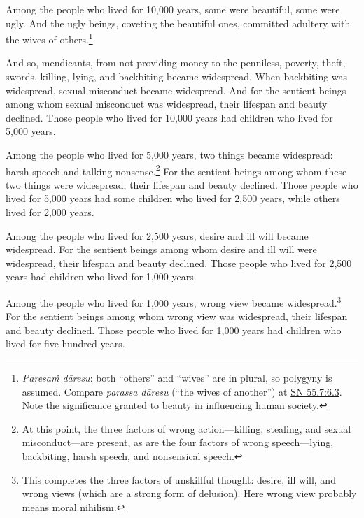 \documentclass[12pt,openany]{book}%
\begin{document}
Among the people who lived for 10,000 years, some were beautiful, some were ugly. And the ugly beings, coveting the beautiful ones, committed adultery with the wives of others.\footnote{\textit{\textsanskrit{Paresaṁ} \textsanskrit{dāresu}}: both “others” and “wives” are in plural, so polygyny is assumed. Compare \textit{parassa \textsanskrit{dāresu}} (“the wives of another”) at \href{https://suttacentral.net/sn55.7/en/sujato\#6.3}{SN 55.7:6.3}. Note the significance granted to beauty in influencing human society. } 

And so, mendicants, from not providing money to the penniless, poverty, theft, swords, killing, lying, and backbiting became widespread. When backbiting was widespread, sexual misconduct became widespread. And for the sentient beings among whom sexual misconduct was widespread, their lifespan and beauty declined. Those people who lived for 10,000 years had children who lived for 5,000 years. 

Among the people who lived for 5,000 years, two things became widespread: harsh speech and talking nonsense.\footnote{At this point, the three factors of wrong action—killing, stealing, and sexual misconduct—are present, as are the four factors of wrong speech—lying, backbiting, harsh speech, and nonsensical speech. } For the sentient beings among whom these two things were widespread, their lifespan and beauty declined. Those people who lived for 5,000 years had some children who lived for 2,500 years, while others lived for 2,000 years. 

Among the people who lived for 2,500 years, desire and ill will became widespread. For the sentient beings among whom desire and ill will were widespread, their lifespan and beauty declined. Those people who lived for 2,500 years had children who lived for 1,000 years. 

Among the people who lived for 1,000 years, wrong view became widespread.\footnote{This completes the three factors of unskillful thought: desire, ill will, and wrong views (which are a strong form of delusion). Here wrong view probably means moral nihilism. } For the sentient beings among whom wrong view was widespread, their lifespan and beauty declined. Those people who lived for 1,000 years had children who lived for five hundred years. 
\end{document}
